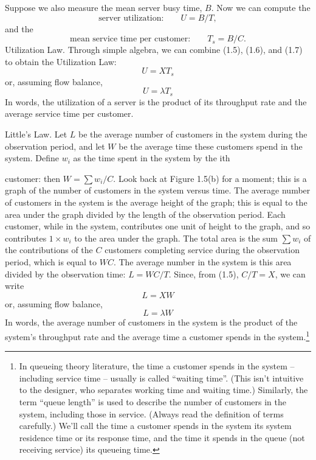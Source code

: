 Suppose we also measure the mean server busy time, $B$. Now we can compute the
\begin{equation}
\text{server utilization:}\qquad U=B/T,
\end{equation}
and the
\begin{equation}
\text{mean service time per customer:}\qquad T_s=B/C.
\end{equation}
Utilization Law. Through simple algebra, we can combine (1.5), (1.6), and (1.7)
to obtain the Utilization Law:
\begin{equation}
U=XT_s
\end{equation}
or, assuming flow balance,
\begin{equation}
U=\lambda T_s
\end{equation}
In words, the utilization of a server is the product of its throughput rate and
the average service time per customer.

Little's Law. Let $L$ be the average number of customers in the system during
the observation period, and let $W$ be the average time these customers spend in
the system. Define $w_i$ as the time spent in the system by the ith

\noindent customer: then $W=\sum w_i/C$. Look back at Figure 1.5(b) for a moment; this
is a graph of the number of customers in the system versus time. The average
number of customers in the system is the average height of the graph; this is
equal to the area under the graph divided by the length of the observation
period. Each customer, while in the system, contributes one unit of height to
the graph, and so contributes $1\times w_i$ to the area under the graph. The
total area is the sum $\sum w_i$ of the contributions of the $C$ customers
completing service during the observation period, which is equal to $WC$. The
average number in the system is this area divided by the observation time:
$L=WC/T$. Since, from (1.5), $C/T=X$, we can write
\begin{equation}
L=XW
\end{equation}
or, assuming flow balance,
\begin{equation}
L=\lambda W
\end{equation}
In words, the average number of customers in the system is the product of the
system's throughput rate and the average time a customer spends in the
system.\footnote{In queueing theory literature, the time a customer spends in the
system -- including service time -- usually is called ``waiting time''. (This
isn't intuitive to the designer, who separates working time and waiting time.)
Similarly, the term ``queue length'' is used to describe the number of customers
in the system, including those in service. (Always read the definition of terms
carefully.) We'll call the time a customer spends in the system its system
residence time or its response time, and the time it spends in the queue (not
receiving service) its queueing time.}

